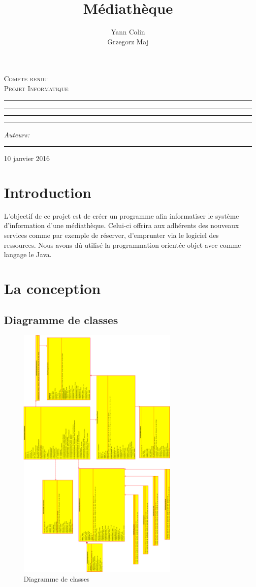 \documentclass[10pt, a4paper]{article}
\author{Yann Colin \\Grzegorz Maj}
\title{Médiathèque}
\makeatletter
\newcommand{\linia}{\rule{\linewidth}{0.4mm}}
\def\maketitle{%
\begin{titlepage}
	\begin{center}
		\LARGE
		\textsc{Compte rendu \\ Projet Informatique}
	\end{center}

	\vspace{3cm}

	\begin{center}\leavevmode
      \hrule
    \vskip 1pt
	\linia
	\vskip 0.5cm
	\Huge \textsc{\@title}\par

	\vskip 0.5cm
      	\linia
      \vskip 1pt
      \hrule

	\vskip 2mm

	\vspace{1.5cm}
	\begin{flushright}
		\begin{minipage}{5cm}
			\textit{\normalsize Auteurs:}\\
			\Large \textit{\@author} \par
			\vskip 2pt
			\hrule
			
		\end{minipage}
	\end{flushright}
    

	\end{center}%
	\vspace*{\stretch{6}}
    \begin{center}
    10 janvier 2016
    \end{center}
\end{titlepage}
	}
\makeatother
\begin{document}

    \maketitle
    
    \tableofcontents
    \newpage
    
    \section{Introduction}
    
    L'objectif de ce projet est de créer un programme afin informatiser le système d'information d'une
    médiathèque. Celui-ci offrira aux adhérents des nouveaux services comme par exemple de réserver,
    d'emprunter via le logiciel des ressources. Nous avons dû utilisé la programmation orientée objet avec comme langage 
    le Java.
    
     \section{La conception}
     
	     \subsection{Diagramme de classes}
		\begin{figure}[ht]
	    \centering
	    		\includegraphics[width=0.7\textwidth]{graphics/class90.eps}
	    		\caption{Diagramme de classes}
	    		\label{fig:label}
	    	\end{figure}
	    	\newpage
     
\end{document}
